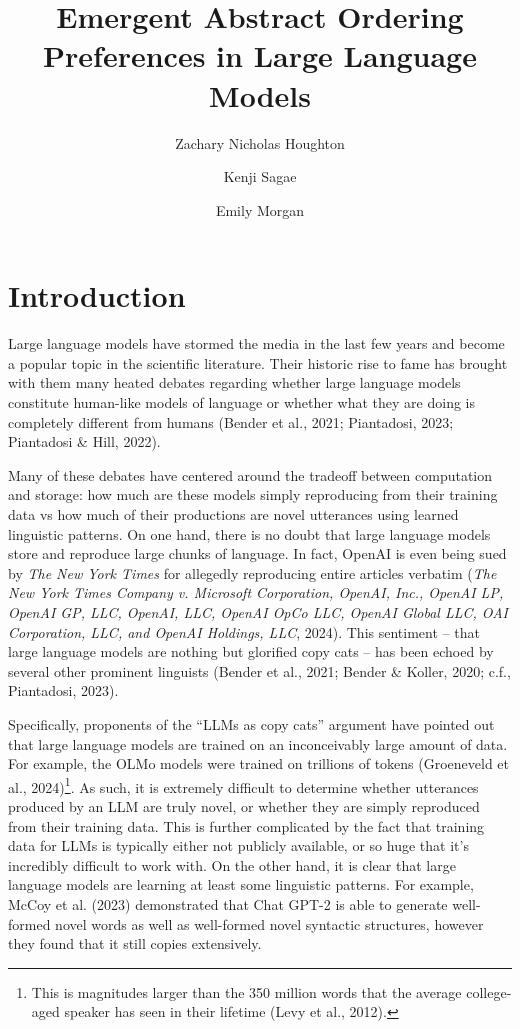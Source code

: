 \documentclass[
  10pt,
  nohyperref]{acl}
\title{Emergent Abstract Ordering Preferences in Large Language Models}
\author{Zachary Nicholas Houghton \and Kenji Sagae \and Emily Morgan}
\date{}
\begin{document}
\maketitle


\section{Introduction}\label{sec-introduction}

Large language models have stormed the media in the last few years and
become a popular topic in the scientific literature. Their historic rise
to fame has brought with them many heated debates regarding whether
large language models constitute human-like models of language or
whether what they are doing is completely different from humans (Bender
et al., 2021; Piantadosi, 2023; Piantadosi \& Hill, 2022).

Many of these debates have centered around the tradeoff between
computation and storage: how much are these models simply reproducing
from their training data vs how much of their productions are novel
utterances using learned linguistic patterns. On one hand, there is no
doubt that large language models store and reproduce large chunks of
language. In fact, OpenAI is even being sued by \emph{The New York
Times} for allegedly reproducing entire articles verbatim (\emph{{The
New York Times Company v. Microsoft Corporation, OpenAI, Inc., OpenAI
LP, OpenAI GP, LLC, OpenAI, LLC, OpenAI OpCo LLC, OpenAI Global LLC, OAI
Corporation, LLC, and OpenAI Holdings, LLC}}, 2024). This sentiment --
that large language models are nothing but glorified copy cats -- has
been echoed by several other prominent linguists (Bender et al., 2021;
Bender \& Koller, 2020; c.f., Piantadosi, 2023).

Specifically, proponents of the ``LLMs as copy cats'' argument have
pointed out that large language models are trained on an inconceivably
large amount of data. For example, the OLMo models were trained on
trillions of tokens (Groeneveld et al., 2024)\footnote{This is
  magnitudes larger than the 350 million words that the average
  college-aged speaker has seen in their lifetime (Levy et al., 2012).}.
As such, it is extremely difficult to determine whether utterances
produced by an LLM are truly novel, or whether they are simply
reproduced from their training data. This is further complicated by the
fact that training data for LLMs is typically either not publicly
available, or so huge that it's incredibly difficult to work with. On
the other hand, it is clear that large language models are learning at
least some linguistic patterns. For example, McCoy et al. (2023)
demonstrated that Chat GPT-2 is able to generate well-formed novel words
as well as well-formed novel syntactic structures, however they found
that it still copies extensively.
\end{document}
